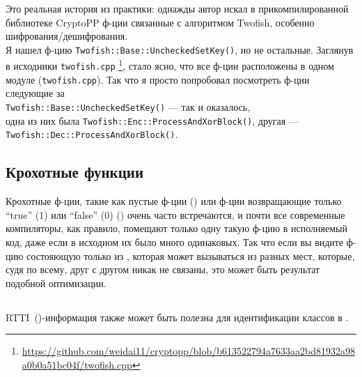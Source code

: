 Это реальная история из практики: однажды автор искал в прикомпилированной библиотеке CryptoPP ф-ции связанные
с алгоритмом Twofish, особенно шифрования/дешифрования.\\
Я нашел ф-цию \verb|Twofish::Base::UncheckedSetKey()|, но не остальные.
Заглянув в исходники \verb|twofish.cpp|
\footnote{\url{https://github.com/weidai11/cryptopp/blob/b613522794a7633aa2bd81932a98a0b0a51bc04f/twofish.cpp}}, стало ясно, что все ф-ции расположены в одном модуле (\verb|twofish.cpp|).
Так что я просто попробовал посмотреть ф-ции следующие за \\
\verb|Twofish::Base::UncheckedSetKey()| --- так и оказалось,\\
одна из них была \verb|Twofish::Enc::ProcessAndXorBlock()|, другая --- \verb|Twofish::Dec::ProcessAndXorBlock()|.

\subsection{Крохотные функции}

Крохотные ф-ции, такие как пустые ф-ции ()
или ф-ции возвращающие только ``true'' (1) или ``false'' (0) () очень часто встречаются,
и почти все современные компиляторы, как правило, помещают только одну такую ф-цию в исполняемый код,
даже если в исходном их было много одинаковых.
Так что если вы видите ф-цию состояющую только из , которая может вызываться из разных мест,
которые, судя по всему, друг с другом никак не связаны, это может быть результат подобной оптимизации.

\subsection{\Cpp}

\ac{RTTI}~()-информация также может быть полезна для идентификации 
классов в \Cpp.

